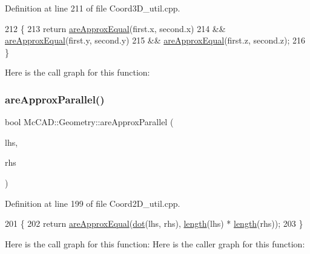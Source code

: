 Definition at line 211 of file Coord3\+D\+\_\+util.\+cpp.


\begin{DoxyCode}
212                               \{
213     \textcolor{keywordflow}{return} \hyperlink{namespaceMcCAD_1_1Geometry_acad920c663ce775977ff6dc46b1030af}{areApproxEqual}(first.x, second.x)
214             && \hyperlink{namespaceMcCAD_1_1Geometry_acad920c663ce775977ff6dc46b1030af}{areApproxEqual}(first.y, second.y)
215             && \hyperlink{namespaceMcCAD_1_1Geometry_acad920c663ce775977ff6dc46b1030af}{areApproxEqual}(first.z, second.z);
216 \}
\end{DoxyCode}
Here is the call graph for this function\+:
\mbox{\label{namespaceMcCAD_1_1Geometry_a5f22eddbae2e5a4f839f409d20d54330}} 
\subsubsection{\texorpdfstring{are\+Approx\+Parallel()}{areApproxParallel()}\hspace{0.1cm}{\footnotesize\ttfamily [1/2]}}
{\footnotesize\ttfamily bool Mc\+C\+A\+D\+::\+Geometry\+::are\+Approx\+Parallel (\begin{DoxyParamCaption}\item[{const \hyperlink{classMcCAD_1_1Geometry_1_1Coord2D}{Coord2D} \&}]{lhs,  }\item[{const \hyperlink{classMcCAD_1_1Geometry_1_1Coord2D}{Coord2D} \&}]{rhs }\end{DoxyParamCaption})}



Definition at line 199 of file Coord2\+D\+\_\+util.\+cpp.


\begin{DoxyCode}
201                            \{
202     \textcolor{keywordflow}{return} \hyperlink{namespaceMcCAD_1_1Geometry_acad920c663ce775977ff6dc46b1030af}{areApproxEqual}(\hyperlink{namespaceMcCAD_1_1Geometry_a3115a59f432b3fc11f4bac6ee17d979b}{dot}(lhs, rhs), \hyperlink{namespaceMcCAD_1_1Geometry_ad2997914c766f1fc561cdd30032b6777}{length}(lhs) * 
      \hyperlink{namespaceMcCAD_1_1Geometry_ad2997914c766f1fc561cdd30032b6777}{length}(rhs));
203 \}
\end{DoxyCode}
Here is the call graph for this function\+:
Here is the caller graph for this function\+:
\mbox{\label{namespaceMcCAD_1_1Geometry_a83dc44516ddc66c937c14bc4b29a0876}} 
